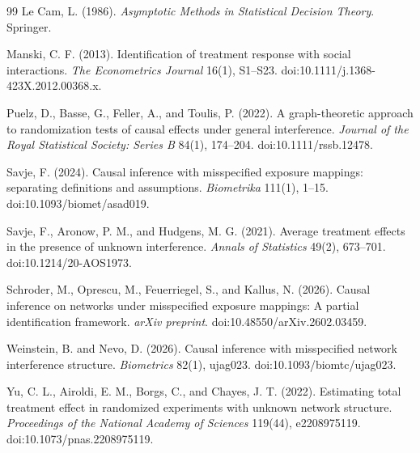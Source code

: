 \documentclass[11pt]{article}
\theoremstyle{definition}
\theoremstyle{plain}
\theoremstyle{remark}
\begin{document}
\begin{thebibliography}{99}
Le Cam, L. (1986).
\emph{Asymptotic Methods in Statistical Decision Theory}.
Springer.

Manski, C. F. (2013).
Identification of treatment response with social interactions.
\emph{The Econometrics Journal} 16(1), S1--S23.
doi:10.1111/j.1368-423X.2012.00368.x.

Puelz, D., Basse, G., Feller, A., and Toulis, P. (2022).
A graph-theoretic approach to randomization tests of causal effects under general interference.
\emph{Journal of the Royal Statistical Society: Series B} 84(1), 174--204.
doi:10.1111/rssb.12478.

Savje, F. (2024).
Causal inference with misspecified exposure mappings: separating definitions and assumptions.
\emph{Biometrika} 111(1), 1--15.
doi:10.1093/biomet/asad019.

Savje, F., Aronow, P. M., and Hudgens, M. G. (2021).
Average treatment effects in the presence of unknown interference.
\emph{Annals of Statistics} 49(2), 673--701.
doi:10.1214/20-AOS1973.

Schroder, M., Oprescu, M., Feuerriegel, S., and Kallus, N. (2026).
Causal inference on networks under misspecified exposure mappings: A partial identification framework.
\emph{arXiv preprint}.
doi:10.48550/arXiv.2602.03459.

Weinstein, B. and Nevo, D. (2026).
Causal inference with misspecified network interference structure.
\emph{Biometrics} 82(1), ujag023.
doi:10.1093/biomtc/ujag023.

Yu, C. L., Airoldi, E. M., Borgs, C., and Chayes, J. T. (2022).
Estimating total treatment effect in randomized experiments with unknown network structure.
\emph{Proceedings of the National Academy of Sciences} 119(44), e2208975119.
doi:10.1073/pnas.2208975119.
\end{thebibliography}
\end{document}
